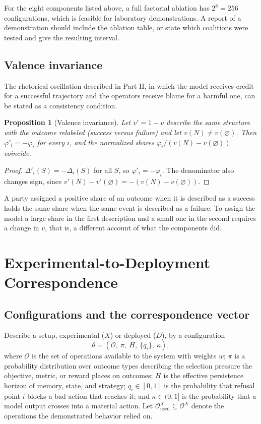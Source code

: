 \documentclass[11pt]{article}
\newtheorem{proposition}[theorem]{Proposition}
\theoremstyle{definition}
\begin{document}
For the eight components listed above, a full factorial ablation has $2^8=256$ configurations, which is feasible for laboratory demonstrations. A report of a demonstration should include the ablation table, or state which coalitions were tested and give the resulting interval.

\subsection{Valence invariance}

The rhetorical oscillation described in Part II, in which the model receives credit for a successful trajectory and the operators receive blame for a harmful one, can be stated as a consistency condition.

\begin{proposition}[Valence invariance]\label{prop:B4}
Let $v'=1-v$ describe the same structure with the outcome relabeled (success versus failure) and let $v(N)\ne v(\varnothing)$. Then $\varphi'_i=-\varphi_i$ for every $i$, and the normalized shares $\varphi_i/(v(N)-v(\varnothing))$ coincide.
\end{proposition}
\begin{proof}
$\Delta'_i(S)=-\Delta_i(S)$ for all $S$, so $\varphi'_i=-\varphi_i$. The denominator also changes sign, since $v'(N)-v'(\varnothing)=-(v(N)-v(\varnothing))$.
\end{proof}

A party assigned a positive share of an outcome when it is described as a success holds the same share when the same event is described as a failure. To assign the model a large share in the first description and a small one in the second requires a change in $v$, that is, a different account of what the components did.

\section{Experimental-to-Deployment Correspondence}\label{app:C}

\subsection{Configurations and the correspondence vector}

Describe a setup, experimental ($X$) or deployed ($D$), by a configuration
\[
\theta=(\mathcal{O},\ \pi,\ H,\ \{q_i\},\ \kappa),
\]
where $\mathcal{O}$ is the set of operations available to the system with weights $w$; $\pi$ is a probability distribution over outcome types describing the selection pressure the objective, metric, or reward places on outcomes; $H$ is the effective persistence horizon of memory, state, and strategy; $q_i\in[0,1]$ is the probability that refusal point $i$ blocks a bad action that reaches it; and $\kappa\in(0,1]$ is the probability that a model output crosses into a material action. Let $\mathcal{O}^X_{\mathrm{used}}\subseteq\mathcal{O}^X$ denote the operations the demonstrated behavior relied on.
\end{document}
